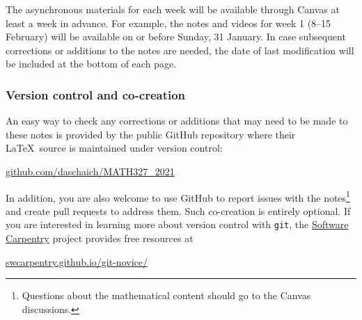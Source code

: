 The asynchronous materials for each week will be available through Canvas at least a week in advance.
For example, the notes and videos for week 1 (8--15 February) will be available on or before Sunday, 31 January.
In case subsequent corrections or additions to the notes are needed, the date of last modification will be included at the bottom of each page.

\subsubsection*{Version control and co-creation}
An easy way to check any corrections or additions that may need to be made to these notes is provided by the public GitHub repository where their \LaTeX\ source is maintained under version control: \\
\centerline{\href{https://github.com/daschaich/MATH327_2021}{github.com/daschaich/MATH327\_2021}}
In addition, you are also welcome to use GitHub to report issues with the notes\footnote{Questions about the mathematical content should go to the Canvas discussions.} and create pull requests to address them.
Such co-creation is entirely optional.
If you are interested in learning more about version control with \texttt{git}, the \href{https://software-carpentry.org}{Software Carpentry} project provides free resources at \\
\centerline{\href{https://swcarpentry.github.io/git-novice/}{swcarpentry.github.io/git-novice/}}

